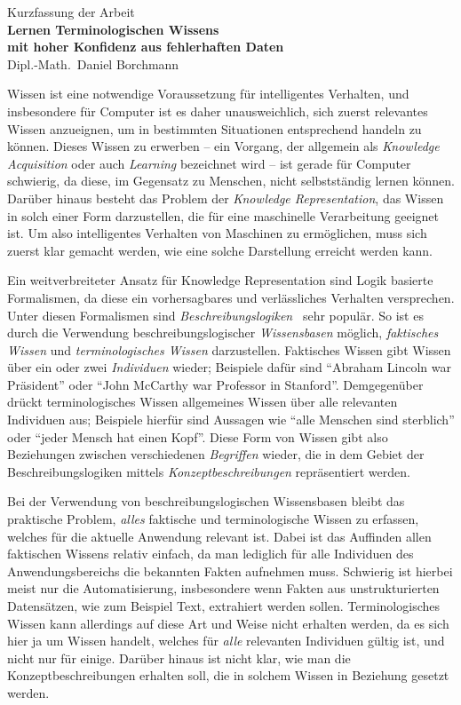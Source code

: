 \documentclass[ngerman,fleqn,DIV=12]{scrartcl}
\begin{document}
\medskip
\begin{center}
  \normalsize Kurzfassung der Arbeit\\
  \LARGE\textbf{Lernen Terminologischen Wissens\\ mit hoher Konfidenz aus fehlerhaften Daten}\\
  \bigskip%
  \large Dipl.-Math.\ Daniel Borchmann
\end{center}
\bigskip
\bigskip

\noindent
Wissen ist eine notwendige Voraussetzung für intelligentes Verhalten, und insbesondere für
Computer ist es daher unausweichlich, sich zuerst relevantes Wissen anzueignen, um in
bestimmten Situationen entsprechend handeln zu können.  Dieses Wissen zu erwerben -- ein
Vorgang, der allgemein als \emph{Knowledge Acquisition} oder auch \emph{Learning}
bezeichnet wird -- ist gerade für Computer schwierig, da diese, im Gegensatz zu Menschen,
nicht selbstständig lernen können.  Darüber hinaus besteht das Problem der \emph{Knowledge
  Representation}, \dh das Wissen in solch einer Form darzustellen, die für eine
maschinelle Verarbeitung geeignet ist.  Um also intelligentes Verhalten von Maschinen zu
ermöglichen, muss sich zuerst klar gemacht werden, wie eine solche Darstellung erreicht
werden kann.

Ein weitverbreiteter Ansatz für Knowledge Representation sind Logik basierte Formalismen,
da diese ein vorhersagbares und verlässliches Verhalten versprechen.  Unter diesen
Formalismen sind \emph{Beschreibungslogiken}~\cite{DLhandbook} sehr populär.  So ist es
durch die Verwendung beschreibungslogischer \emph{Wissensbasen} möglich, \emph{faktisches
  Wissen} und \emph{terminologisches Wissen} darzustellen.  Faktisches Wissen gibt Wissen
über ein oder zwei \emph{Individuen} wieder; Beispiele dafür sind \enquote{Abraham Lincoln
  war Präsident} oder \enquote{John McCarthy war Professor in Stanford}.  Demgegenüber
drückt terminologisches Wissen allgemeines Wissen über alle relevanten Individuen aus;
Beispiele hierfür sind Aussagen wie \enquote{alle Menschen sind sterblich} oder
\enquote{jeder Mensch hat einen Kopf}.  Diese Form von Wissen gibt also Beziehungen
zwischen verschiedenen \emph{Begriffen} wieder, die in dem Gebiet der Beschreibungslogiken
mittels \emph{Konzeptbeschreibungen} repräsentiert werden.

Bei der Verwendung von beschreibungslogischen Wissensbasen bleibt das praktische Problem,
\emph{alles} faktische und terminologische Wissen zu erfassen, welches für die aktuelle
Anwendung relevant ist.  Dabei ist das Auffinden allen faktischen Wissens relativ einfach,
da man lediglich für alle Individuen des Anwendungsbereichs die bekannten Fakten aufnehmen
muss.  Schwierig ist hierbei meist nur die Automatisierung, insbesondere wenn Fakten aus
unstrukturierten Datensätzen, wie zum Beispiel Text, extrahiert werden sollen.
Terminologisches Wissen kann allerdings auf diese Art und Weise nicht erhalten werden, da
es sich hier ja um Wissen handelt, welches für \emph{alle} relevanten Individuen gültig
ist, und nicht nur für einige.  Darüber hinaus ist nicht klar, wie man die
Konzeptbeschreibungen erhalten soll, die in solchem Wissen in Beziehung gesetzt werden.
\end{document}
